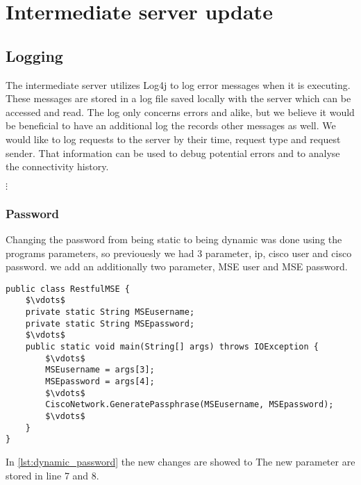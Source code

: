 \section{Intermediate server update}

\subsection*{Logging}
The intermediate server utilizes Log4j \cite{log4j} to log error messages when it is executing. These messages are stored in a log file saved locally with the server which can be accessed and read. The log only concerns errors and alike, but we believe it would be beneficial to have an additional log the records other messages as well. We would like to log requests to the server by their time, request type and request sender. That information can be used to debug potential errors and to analyse the connectivity history. 



$\vdots$


\subsubsection*{Password}
Changing the password from being static to being dynamic was done using the programs parameters, so previouesly we had 3 parameter, ip, cisco user and cisco password. we add an additionally two parameter, MSE user and MSE password.

\begin{lstlisting}[caption={Failed Connection snapshot},label={lst:dynamic_password},language=inc_Java, mathescape]
public class RestfulMSE {
	$\vdots$
	private static String MSEusername;
    private static String MSEpassword;
    $\vdots$
    public static void main(String[] args) throws IOException {
    	$\vdots$
   		MSEusername = args[3];
    	MSEpassword = args[4];
    	$\vdots$
    	CiscoNetwork.GeneratePassphrase(MSEusername, MSEpassword);
    	$\vdots$
    }
}
\end{lstlisting}

In \cref{lst:dynamic_password} the new changes are showed to 
The new parameter are stored in line 7 and 8. 
